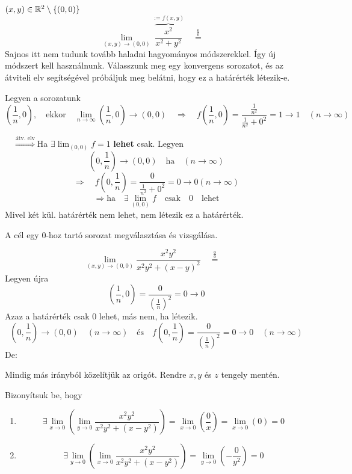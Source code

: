 \documentclass[a4paper,11.5pt]{article}
\begin{document}
	\begin{task}$(x,y)\in\mathbb{R}^2\setminus\{(0,0)\}$
		\[ \lim_{(x,y)\to(0,0)}\overbrace{\frac{x^2}{x^2+y^2}}^{:=f(x,y)}\quad \overset{\frac{0}{0}}{=}\quad  \]
		Sajnos itt nem tudunk tovább haladni hagyományos módszerekkel. Így új módszert kell használnunk. Válasszunk meg egy konvergens sorozatot, és az átviteli elv segítségével próbáljuk meg belátni, hogy ez a határérték létezik-e.
		\smallskip
		
		Legyen a sorozatunk \[\left(\frac{1}{n},0\right),\quad \text{ekkor}\quad  \lim_{n\to\infty}\left(\frac{1}{n},0\right)\to(0,0)\quad \Rightarrow\quad f\left(\frac{1}{n},0\right)=\frac{\frac{1}{n^2}}{\frac{1}{n^2}+0^2}=1 \to1\quad (n\to\infty)\]
		
		$\quad \overset{\text{átv. elv}}{\Rightarrow}$\quad Ha $\exists\lim_{(0,0)}f=1$ \textbf{lehet} csak.
		Legyen 
		\[ \left(0,\frac{1}{n}\right)\to(0,0)\quad \text{ha}\quad (n\to\infty) \]
		\[ \Rightarrow\quad f\left(0,\frac{1}{n}\right)=\frac{0}{\frac{1}{n^2}+0^2}=0\to 0(n\to\infty) \]
		\[ \Rightarrow \text{ha}\quad \exists\lim_{(0,0)}f\quad \text{csak}\quad 0 \quad \text{lehet} \]
		Mivel két kül. határérték nem lehet, nem létezik ez a határérték.
	\end{task}
	\begin{note}
		A cél egy 0-hoz tartó sorozat megválasztása és vizsgálása.
	\end{note}
	\begin{task}
		\[ \lim_{(x,y)\to(0,0)}\frac{x^2y^2}{x^2y^2+(x-y)^2}\quad \overset{\frac{0}{0}}{=}\quad  \]
		Legyen újra
		\[ \left(\frac{1}{n},0\right)=\frac{0}{\left(\frac{1}{n}\right)^2}=0\to0 \]
		Azaz a határérték csak 0 lehet, más nem, ha létezik.
		\[ \left(0,\frac{1}{n}\right)\to(0,0)\quad (n\to\infty)\quad \text{és}\quad  f\left(0,\frac{1}{n}\right)=\frac{0}{\left(\frac{1}{n}\right)^2}=0\to 0\quad (n\to\infty) \]
		De:
	\end{task}
	\begin{note}
		Mindig más irányból közelítjük az origót. Rendre $x, y$ és $z$ tengely mentén.
	\end{note}
	\begin{exercise}
		Bizonyítsuk be, hogy
		\begin{enumerate}
			\item \[ \exists\lim_{x\to0}\left(\lim_{y\to0}\frac{x^2y^2}{x^2y^2+(x-y^2)}\right)=\lim_{x\to0}\left(\frac{0}{x}\right)=\lim_{x\to0}(0)=0 \]
			\item \[ \exists\lim_{y\to0}\left(\lim_{x\to0}\frac{x^2y^2}{x^2y^2+(x-y^2)}\right)=\lim_{y\to0}\left(-\frac{0}{y^2}\right)=0 \]
		\end{enumerate}
	\end{exercise}
\end{document}

